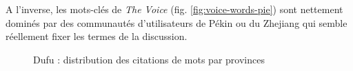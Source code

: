 A l{\textquoteright}inverse, les mots-cl\'es de \textit{The Voice} (fig. \ref{fig:voice-words-pie}) sont
nettement domin\'es par des communaut\'es d{\textquoteright}utilisateurs de P\'ekin ou du Zhejiang qui semble r\'eellement fixer les termes de la discussion.

\begin{figure}
    \centering
    \newline
    \caption{
      Dufu : distribution des citations de mots par provinces 
    }
    \label{fig:biaoge-words-pie}
\end{figure}

